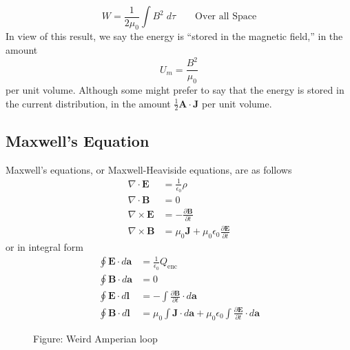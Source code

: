 \documentclass[../../../main.tex]{subfiles}
\begin{document}
\begin{equation*}
    W=\frac{1}{2\mu_0}\int B^2 \;d\tau\qquad\text{Over all Space}
\end{equation*}
In view of this result, we say the energy is “stored in the magnetic ﬁeld,” in the amount
\begin{equation*}
    U_m=\frac{B^2}{\mu_0}
\end{equation*}
per unit volume. Although some might prefer to say that the energy is stored in the current distribution, in the amount $\frac{1}{2}\mathbf{A}\cdot\mathbf{J}$ per unit volume.

\subsection{Maxwell's Equation}
Maxwell's equations, or Maxwell-Heaviside equations, are as follows
\begin{align*}
    \nabla\cdot\mathbf{E}  & =\frac{1}{\epsilon_0}\rho                                              \\
    \nabla\cdot\mathbf{B}  & =0                                                                     \\
    \nabla\times\mathbf{E} & =-\frac{\partial \mathbf{B}}{\partial t}                               \\
    \nabla\times\mathbf{B} & =\mu_0\mathbf{J}+\mu_0\epsilon_0\frac{\partial \mathbf{E}}{\partial t}
\end{align*}
or in integral form
\begin{align*}
    \oint \mathbf{E}\cdot d\mathbf{a} & =\frac{1}{\epsilon_0}Q_\text{enc}                                                                                  \\
    \oint \mathbf{B}\cdot d\mathbf{a} & =0                                                                                                                 \\
    \oint \mathbf{E}\cdot d\mathbf{l} & =-\int \frac{\partial \mathbf{B}}{\partial t}\cdot d\mathbf{a}                                                     \\
    \oint \mathbf{B}\cdot d\mathbf{l} & =\mu_0\int\mathbf{J}\cdot d\mathbf{a}+ \mu_0\epsilon_0 \int\frac{\partial \mathbf{E}}{\partial t}\cdot d\mathbf{a}
\end{align*}

\begin{figure}[b]
    \centering
    \caption*{Figure: Weird Amperian loop}
\end{figure}
\end{document}
